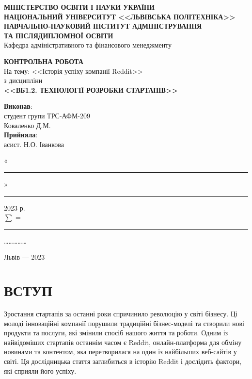 \documentclass[oneside,14pt]{extarticle}
\begin{document}
\begin{titlepage}
	\begin{center}
		\textbf{МІНІСТЕРСТВО ОСВІТИ І НАУКИ УКРАЇНИ\\
		НАЦІОНАЛЬНИЙ УНІВЕРСИТУТ <<ЛЬВІВСЬКА ПОЛІТЕХНІКА>>\\
		НАВЧАЛЬНО-НАУКОВИЙ ІНСТИТУТ АДМІНІСТРУВАННЯ\\
		ТА ПІСЛЯДИПЛОМНОЇ ОСВІТИ\\}
		Кафедра адміністративного та фінансового менеджменту

		
		\vspace{130pt}
		\textbf{КОНТРОЛЬНА РОБОТА}\\
		На тему:
		<<Історія успіху компанії Reddit>>\\
		з дисципліни\\
		\textbf{<<ВБ1.2. ТЕХНОЛОГІЇ РОЗРОБКИ СТАРТАПІВ>>}
		\vspace*{40pt}
		
		\begin{flushright}
			\textbf{Виконав}:\\
			
			студент групи ТРС-АФМ-209\\
			Коваленко Д.М.\\
			\vspace{10pt}
			\textbf{Прийняла}:\\
			асист. Н.О. Іванкова
			
			\vspace{28pt}
			«\rule{1cm}{0.15mm}» \rule{1.5cm}{0.15mm} 2023 р.\\
			$\sum$ = \rule{1cm}{0.15mm}……………\\
			
		\end{flushright}
		\vspace{\fill}
		Львів — 2023
	\end{center}
\end{titlepage}
\setcounter{page}{2}
\tableofcontents
\newpage

\section*{ВСТУП}

Зростання стартапів за останні роки спричинило революцію у світі бізнесу. Ці молоді інноваційні компанії порушили традиційні бізнес-моделі та створили нові продукти та послуги, які змінили спосіб нашого життя та роботи. Одним із найвідоміших стартапів останнім часом є Reddit, онлайн-платформа для обміну новинами та контентом, яка перетворилася на один із найбільших веб-сайтів у світі. Ця дослідницька стаття заглибиться в історію Reddit і дослідить фактори, які сприяли його успіху.
\end{document}
